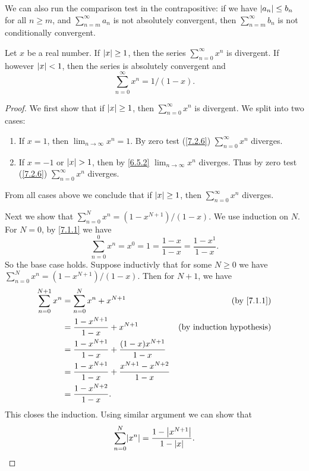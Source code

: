 \begin{note}
  We can also run the comparison test in the contrapositive:
  if we have \(\left\lvert a_n\right\rvert \leq b_n\) for all \(n \geq m\), and \(\sum_{n = m}^\infty a_n\) is not absolutely convergent, then \(\sum_{n = m}^\infty b_n\) is not conditionally convergent.
\end{note}

\begin{lem}\label{7.3.3}
  Let \(x\) be a real number.
  If \(\left\lvert x\right\rvert \geq 1\), then the series \(\sum_{n = 0}^\infty x^n\) is divergent.
  If however \(\left\lvert x\right\rvert < 1\), then the series is absolutely convergent and
  \[
    \sum_{n = 0}^\infty x^n = 1 / (1 - x).
  \]
\end{lem}

\begin{proof}
  We first show that if \(\left\lvert x\right\rvert \geq 1\), then \(\sum_{n = 0}^\infty x^n\) is divergent.
  We split into two cases:
  \begin{enumerate}
    \item If \(x = 1\), then \(\lim_{n \to \infty} x^n = 1\). By zero test (\cref{7.2.6}) \(\sum_{n = 0}^\infty x^n\) diverges.
    \item If \(x = -1\) or \(\left\lvert x\right\rvert > 1\), then by \cref{6.5.2} \(\lim_{n \to \infty} x^n\) diverges.
          Thus by zero test (\cref{7.2.6}) \(\sum_{n = 0}^\infty x^n\) diverges.
  \end{enumerate}
  From all cases above we conclude that if \(\left\lvert x\right\rvert \geq 1\), then \(\sum_{n = 0}^\infty x^n\) diverges.

  Next we show that \(\sum_{n = 0}^N x^n = (1 - x^{N + 1}) / (1 - x)\).
  We use induction on \(N\).
  For \(N = 0\), by \cref{7.1.1} we have
  \[
    \sum_{n = 0}^0 x^n = x^0 = 1 = \frac{1 - x}{1 - x} = \frac{1 - x^1}{1 - x}.
  \]
  So the base case holds.
  Suppose inductivly that for some \(N \geq 0\) we have \(\sum_{n = 0}^N x^n = (1 - x^{N + 1}) / (1 - x)\).
  Then for \(N + 1\), we have
  \begin{align*}
    \sum_{n = 0}^{N + 1} x^n & = \sum_{n = 0}^N x^n + x^{N + 1}                                    & \text{(by \cref{7.1.1})}         \\
                             & = \frac{1 - x^{N + 1}}{1 - x} + x^{N + 1}                           & \text{(by induction hypothesis)} \\
                             & = \frac{1 - x^{N + 1}}{1 - x} + \frac{(1 - x) x^{N + 1}}{1 - x}                                        \\
                             & = \frac{1 - x^{N + 1}}{1 - x} + \frac{x^{N + 1} - x^{N + 2}}{1 - x}                                    \\
                             & = \frac{1 - x^{N + 2}}{1 - x}.
  \end{align*}
  This closes the induction.
  Using similar argument we can show that
  \[
    \sum_{n = 0}^N \abs{x^n} = \frac{1 - \abs{x^{N + 1}}}{1 - \abs{x}}.
  \]


\end{proof}
